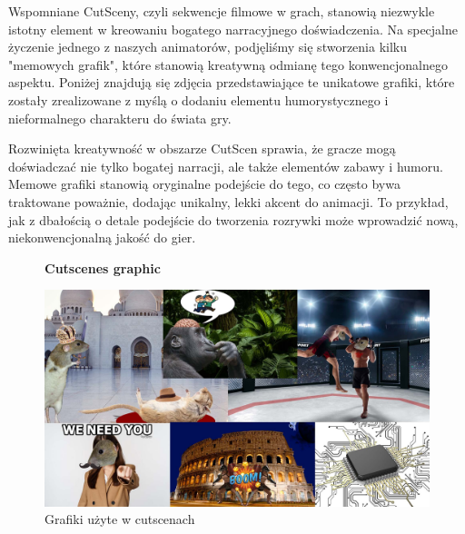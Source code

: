 Wspomniane CutSceny, czyli sekwencje filmowe w grach, stanowią niezwykle istotny element w kreowaniu bogatego narracyjnego doświadczenia. Na specjalne życzenie jednego z naszych animatorów, podjęliśmy się stworzenia kilku "memowych grafik", które stanowią kreatywną odmianę tego konwencjonalnego aspektu. Poniżej znajdują się zdjęcia przedstawiające te unikatowe grafiki, które zostały zrealizowane z myślą o dodaniu elementu humorystycznego i nieformalnego charakteru do świata gry.

Rozwinięta kreatywność w obszarze CutScen sprawia, że gracze mogą doświadczać nie tylko bogatej narracji, ale także elementów zabawy i humoru. Memowe grafiki stanowią oryginalne podejście do tego, co często bywa traktowane poważnie, dodając unikalny, lekki akcent do animacji. To przykład, jak z dbałością o detale podejście do tworzenia rozrywki może wprowadzić nową, niekonwencjonalną jakość do gier.

\begin{figure}[h]
\begin{center}
{\bfseries Cutscenes graphic}
\end{center}
    \centering
    \includegraphics[width=1\linewidth]{Images/wszystkie grafiki.jpg}
        \caption{Grafiki użyte w cutscenach}
\end{figure}
\FloatBarrier
